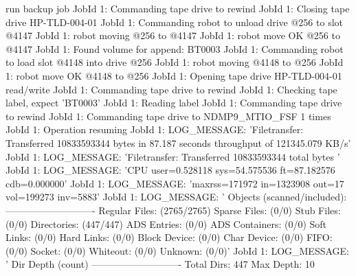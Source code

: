 \begin{bconsole}{run backup job}
JobId 1: Commanding tape drive to rewind
JobId 1: Closing tape drive HP-TLD-004-01
JobId 1: Commanding robot to unload drive @256 to slot @4147
JobId 1: robot moving @256 to @4147
JobId 1: robot move OK @256 to @4147
JobId 1: Found volume for append: BT0003
JobId 1: Commanding robot to load slot @4148 into drive @256
JobId 1: robot moving @4148 to @256
JobId 1: robot move OK @4148 to @256
JobId 1: Opening tape drive HP-TLD-004-01 read/write
JobId 1: Commanding tape drive to rewind
JobId 1: Checking tape label, expect 'BT0003'
JobId 1: Reading label
JobId 1: Commanding tape drive to rewind
JobId 1: Commanding tape drive to NDMP9_MTIO_FSF 1 times
JobId 1: Operation resuming
JobId 1: LOG_MESSAGE: 'Filetransfer: Transferred 10833593344 bytes in 87.187 seconds throughput of 121345.079 KB/s'
JobId 1: LOG_MESSAGE: 'Filetransfer: Transferred 10833593344 total bytes '
JobId 1: LOG_MESSAGE: 'CPU  user=0.528118  sys=54.575536  ft=87.182576  cdb=0.000000'
JobId 1: LOG_MESSAGE: 'maxrss=171972  in=1323908  out=17  vol=199273  inv=5883'
JobId 1: LOG_MESSAGE: '
        Objects (scanned/included):
        ----------------------------
        Regular Files:          (2765/2765)
        Sparse Files:           (0/0)
        Stub Files:             (0/0)
        Directories:            (447/447)
        ADS Entries:            (0/0)
        ADS Containers:         (0/0)
        Soft Links:             (0/0)
        Hard Links:             (0/0)
        Block Device:           (0/0)
        Char Device:            (0/0)
        FIFO:                   (0/0)
        Socket:                 (0/0)
        Whiteout:               (0/0)
        Unknown:                (0/0)'
JobId 1: LOG_MESSAGE: '
        Dir Depth (count)
        ----------------------------
        Total Dirs:             447
        Max Depth:              10


\end{bconsole}
